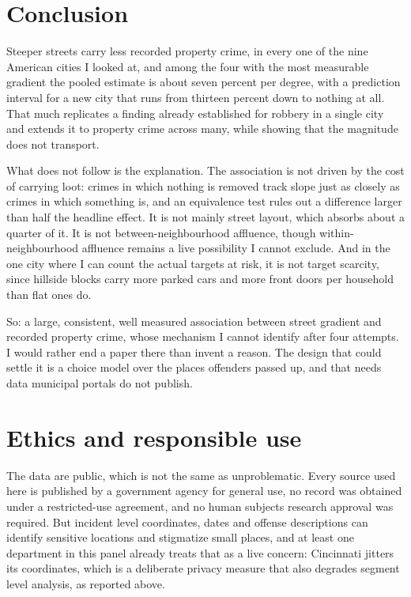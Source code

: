\documentclass[10pt,letterpaper]{article}
\begin{document}
\section*{Conclusion}

Steeper streets carry less recorded property crime, in every one of the nine American
cities I looked at, and among the four with the most measurable gradient the pooled
estimate is about seven percent per degree, with a prediction interval for a new city
that runs from thirteen percent down to nothing at all. That much replicates a finding
already established for robbery in a single city and extends it to property crime
across many, while showing that the magnitude does not transport.

What does not follow is the explanation. The association is not driven by the cost of
carrying loot: crimes in which nothing is removed track slope just as closely as
crimes in which something is, and an equivalence test rules out a difference larger
than half the headline effect. It is not mainly street layout, which absorbs about a
quarter of it. It is not between-neighbourhood affluence, though within-neighbourhood
affluence remains a live possibility I cannot exclude. And in the one city where I can
count the actual targets at risk, it is not target scarcity, since hillside blocks
carry more parked cars and more front doors per household than flat ones do.

So: a large, consistent, well measured association between street gradient and
recorded property crime, whose mechanism I cannot identify after four attempts. I
would rather end a paper there than invent a reason. The design that could settle it
is a choice model over the places offenders passed up, and that needs data municipal
portals do not publish.

\section*{Ethics and responsible use}

The data are public, which is not the same as unproblematic. Every source used here
is published by a government agency for general use, no record was obtained under a
restricted-use agreement, and no human subjects research approval was required. But
incident level coordinates, dates and offense descriptions can identify sensitive
locations and stigmatize small places, and at least one department in this panel
already treats that as a live concern: Cincinnati jitters its coordinates, which is a
deliberate privacy measure that also degrades segment level analysis, as reported
above.
\end{document}
